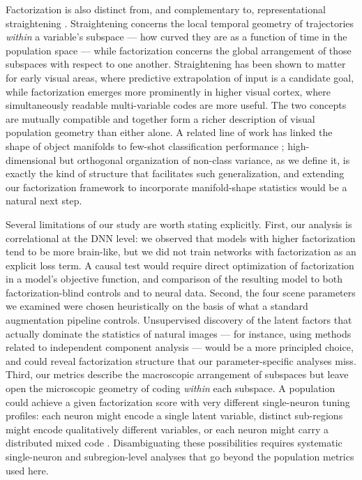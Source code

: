 \documentclass[11pt]{article}
\begin{document}
Factorization is also distinct from, and complementary to, representational
straightening \citep{henaff2019perceptual, henaff2021primary}. Straightening
concerns the local temporal geometry of trajectories \emph{within} a
variable's subspace --- how curved they are as a function of time in the
population space --- while factorization concerns the global arrangement of
those subspaces with respect to one another. Straightening has been shown
to matter for early visual areas, where predictive extrapolation of input is
a candidate goal, while factorization emerges more prominently in higher
visual cortex, where simultaneously readable multi-variable codes are more
useful. The two concepts are mutually compatible and together form a richer
description of visual population geometry than either alone. A related line
of work has linked the shape of object manifolds to few-shot classification
performance \citep{sorscher2022neural}; high-dimensional but orthogonal
organization of non-class variance, as we define it, is exactly the kind of
structure that facilitates such generalization, and extending our
factorization framework to incorporate manifold-shape statistics would be a
natural next step.

Several limitations of our study are worth stating explicitly. First, our
analysis is correlational at the DNN level: we observed that models with
higher factorization tend to be more brain-like, but we did not train
networks with factorization as an explicit loss term. A causal test would
require direct optimization of factorization in a model's objective
function, and comparison of the resulting model to both factorization-blind
controls and to neural data. Second, the four scene parameters we examined
were chosen heuristically on the basis of what a standard augmentation
pipeline controls. Unsupervised discovery of the latent factors that
actually dominate the statistics of natural images --- for instance, using
methods related to independent component analysis --- would be a more
principled choice, and could reveal factorization structure that our
parameter-specific analyses miss. Third, our metrics describe the
macroscopic arrangement of subspaces but leave open the microscopic
geometry of coding \emph{within} each subspace. A population could achieve a
given factorization score with very different single-neuron tuning
profiles: each neuron might encode a single latent variable, distinct
sub-regions might encode qualitatively different variables, or each neuron
might carry a distributed mixed code
\citep{rigotti2013importance, fusi2016why, freiwald2010functional,
hong2016explicit}. Disambiguating these possibilities requires systematic
single-neuron and subregion-level analyses that go beyond the population
metrics used here.
\end{document}
